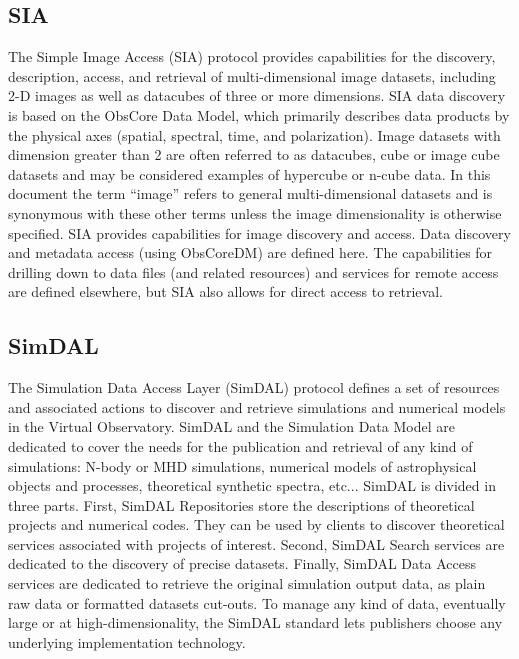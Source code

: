 \documentclass[11pt,a4paper]{ivoa}
\begin{document}
\subsection{SIA}

The Simple Image Access (SIA) \citep{2015ivoa.spec.1223D} protocol provides capabilities for the discovery, description, 
access, and retrieval of multi-dimensional image datasets, including 2-D images as well 
as datacubes of three or more dimensions. SIA data discovery is based on the ObsCore Data 
Model, which primarily describes data products by the physical axes (spatial, spectral, 
time, and polarization). Image datasets with dimension greater than 2 are often referred 
to as datacubes, cube or image cube datasets and may be considered examples of hypercube 
or n-cube data. In this document the term ``image'' refers to general multi-dimensional 
datasets and is synonymous with these other terms unless the image dimensionality is 
otherwise specified. SIA provides capabilities for image discovery and access. Data 
discovery and metadata access (using ObsCoreDM) are defined here. The capabilities for 
drilling down to data files (and related resources) and services for remote access are 
defined elsewhere, but SIA also allows for direct access to retrieval. 

\subsection{SimDAL}

The Simulation Data Access Layer (SimDAL) \citep{2017ivoa.spec.0320L} protocol defines a set of resources and associated 
actions to discover and retrieve simulations and numerical models in the Virtual Observatory. 
SimDAL and the Simulation Data Model are dedicated to cover the needs for the publication 
and retrieval of any kind of simulations: N-body or MHD simulations, numerical models of 
astrophysical objects and processes, theoretical synthetic spectra, etc... SimDAL is 
divided in three parts. First, SimDAL Repositories store the descriptions of theoretical 
projects and numerical codes. They can be used by clients to discover theoretical 
services associated with projects of interest. Second, SimDAL Search services are 
dedicated to the discovery of precise datasets. Finally, SimDAL Data Access services 
are dedicated to retrieve the original simulation output data, as plain raw data or 
formatted datasets cut-outs. To manage any kind of data, eventually large or at 
high-dimensionality, the SimDAL standard lets publishers choose any underlying 
implementation technology. 
\end{document}
